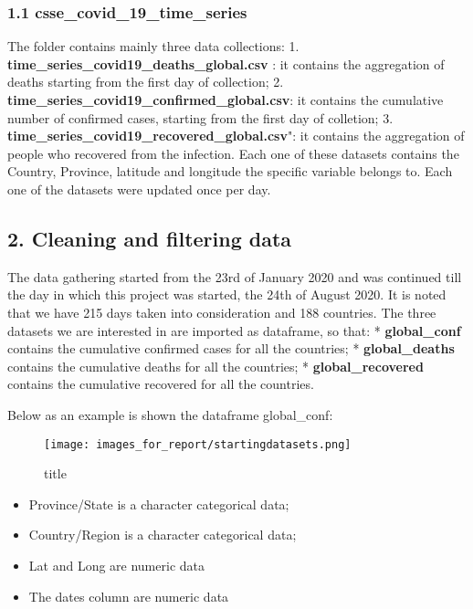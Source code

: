\documentclass[11pt]{article}
\makeatletter
\def\maxwidth{\ifdim\Gin@nat@width>\linewidth\linewidth
    \else\Gin@nat@width\fi}
\let\Oldincludegraphics\includegraphics
\renewcommand{\includegraphics}[1]{\Oldincludegraphics[width=.8\maxwidth]{#1}}
\providecommand{\tightlist}{%
      \setlength{\itemsep}{0pt}\setlength{\parskip}{0pt}}
\makeatother
\begin{document}
\hypertarget{csse_covid_19_time_series}{%
\subsubsection{1.1
csse\_covid\_19\_time\_series}\label{csse_covid_19_time_series}}

The folder contains mainly three data collections: 1.
\textbf{time\_series\_covid19\_deaths\_global.csv} : it contains the
aggregation of deaths starting from the first day of collection; 2.
\textbf{time\_series\_covid19\_confirmed\_global.csv}: it contains the
cumulative number of confirmed cases, starting from the first day of
colletion; 3. \textbf{time\_series\_covid19\_recovered\_global.csv}": it
contains the aggregation of people who recovered from the infection.
Each one of these datasets contains the Country, Province, latitude and
longitude the specific variable belongs to. Each one of the datasets
were updated once per day.

    \hypertarget{cleaning-and-filtering-data}{%
\subsection{2. Cleaning and filtering
data}\label{cleaning-and-filtering-data}}

The data gathering started from the 23rd of January 2020 and was
continued till the day in which this project was started, the 24th of
August 2020. It is noted that we have 215 days taken into consideration
and 188 countries. The three datasets we are interested in are imported
as dataframe, so that: * \textbf{global\_conf} contains the cumulative
confirmed cases for all the countries; * \textbf{global\_deaths}
contains the cumulative deaths for all the countries; *
\textbf{global\_recovered} contains the cumulative recovered for all the
countries.

Below as an example is shown the dataframe global\_conf:

\begin{figure}
\centering
\texttt{[image: images\_for\_report/startingdatasets.png]}
\caption{title}
\end{figure}

\begin{itemize}
\tightlist
\item
  Province/State is a character categorical data;
\item
  Country/Region is a character categorical data;
\item
  Lat and Long are numeric data
\item
  The dates column are numeric data
\end{itemize}
\end{document}
